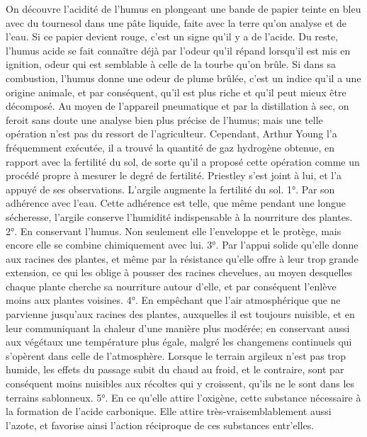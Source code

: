 On découvre l'acidité de l'humus en plongeant une bande de papier teinte en bleu avec du tournesol dans une pâte liquide, faite avec la terre qu'on analyse et de l'eau. Si ce papier devient rouge, c'est un signe qu'il y a de l'acide. Du reste, l'humus acide se fait connaître déjà par l'odeur qu'il répand lorsqu'il est mis en ignition, odeur qui est semblable à celle de la tourbe qu'on brûle. Si dans sa combustion, l'humus donne une odeur de plume brûlée, c'est un indice qu'il a une origine animale, et par conséquent, qu'il est plus riche et qu'il peut mieux être décomposé.\setcounter{page}{108} Au moyen de l'appareil pneumatique et par la distillation à sec, on feroit sans doute une analyse bien plus précise de l'humus; mais une telle opération n'est pas du ressort de l'agriculteur. Cependant, Arthur Young l'a fréquemment exécutée, il a trouvé la quantité de gaz hydrogène obtenue, en rapport avec la fertilité du sol, de sorte qu'il a proposé cette opération comme un procédé propre à mesurer le degré de fertilité. Priestley s'est joint à lui, et l'a appuyé de ses observations.
L'argile augmente la fertilité du sol.
1°. Par son adhérence avec l'eau. Cette adhérence est telle, que même pendant une longue sécheresse, l'argile conserve l'humidité indispensable à la nourriture des plantes.
2°. En conservant l'humus. Non seulement elle l'enveloppe et le protège, mais encore elle se combine chimiquement avec lui.
3°. Par l'appui solide qu'elle donne aux racines des plantes, et même par la résistance qu'elle offre à leur trop grande extension, ce qui les oblige à pousser des racines chevelues, au moyen desquelles chaque plante cherche sa nourriture autour d'elle, et par conséquent l'enlève moins aux plantes voisines.
4°. En empêchant que l'air atmosphérique\setcounter{page}{109} que ne parvienne jusqu'aux racines des plantes, auxquelles il est toujours nuisible, et en leur communiquant la chaleur d'une manière plus modérée; en conservant aussi aux végétaux une température plus égale, malgré les changemens continuels qui s'opèrent dans celle de l'atmosphère. Lorsque le terrain argileux n'est pas trop humide, les effets du passage subit du chaud au froid, et le contraire, sont par conséquent moins nuisibles aux récoltes qui y croissent, qu'ils ne le sont dans les terrains sablonneux.
5°. En ce qu'elle attire l'oxigène, cette substance nécessaire à la formation de l'acide carbonique. Elle attire très-vraisemblablement aussi l'azote, et favorise ainsi l'action réciproque de ces substances entr'elles.

